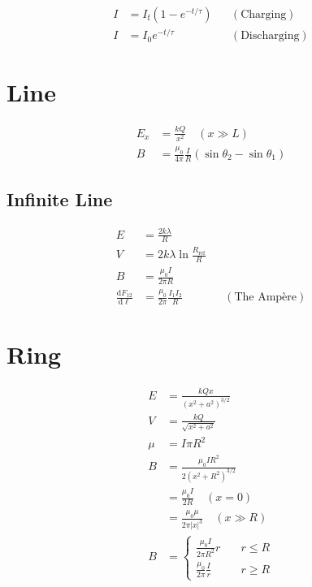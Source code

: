 \documentclass[10pt]{article}
\newcommand{\id}[1]{\mathrm{d} #1}
\begin{document}
\begin{multicols*}{5}
\begin{align*}
    I &= I_\mathrm{f} (1 - e^{-t/\tau}) && (\text{Charging})\\
    I &= I_0 e^{-t/\tau} && (\text{Discharging})
\end{align*}

\vspace*{20ex}
\section{Line}

\begin{align*}
    E_x &= \frac{kQ}{x^2} \quad (x \gg L)\\
    B &= \frac{\mu_0}{4\pi} \frac{I}{R} \left({\sin \theta_2 - \sin
	    \theta_1}\right)
\end{align*}

\subsection{Infinite Line}

\begin{align*}
    E &= \frac{2k\lambda}{R}\\
    V &= 2k\lambda \ln \frac{R_\text{ref}}{R}\\
    B &= \frac{\mu_0 I}{2\pi R}\\
    \frac{\id{F_{12}}}{\id{\ell}} &= \frac{\mu_0}{2\pi} \frac{I_1 I_2}
    {R} && (\text{The Amp\`{e}re})
\end{align*}

\section{Ring}

\begin{align*}
    E &= \frac{kQx}{\left({x^2 + a^2}\right)^{3/2}}\\
    V &= \frac{kQ}{\sqrt{x^2 + a^2}}\\
    \mu &= I\pi R^2\\
    B &= \frac{\mu_0IR^2}{2\left({x^2 + R^2}\right)^{3/2}}\\
	  &= \frac{\mu_0 I}{2R} \quad (x = 0)\\
      &= \frac{\mu_0 \mu}{2\pi |x|^3} \quad (x \gg R)\\
    B &= 
    \begin{cases}
	\frac{\mu_0I}{2\pi R^2} r & \quad r \leq R\\
	\frac{\mu_0}{2\pi} \frac{I}{r} & \quad r \geq R
    \end{cases}\\
\end{align*}


\end{multicols*}
\end{document}
